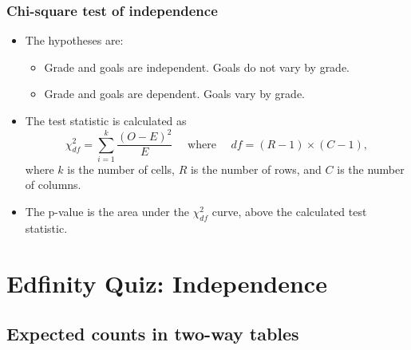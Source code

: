 \documentclass[slidestop,compress,mathserif]{beamer}
\begin{document}
\begin{frame}
\frametitle{Chi-square test of independence}

\begin{itemize}
\item The hypotheses are:
\begin{itemize}
\item[$H_0$:] Grade and goals are independent. Goals do not vary by grade.
\item[$H_A$:] Grade and goals are dependent. Goals vary by grade.
\end{itemize}

\pause

\item The test statistic is calculated as
\[ \chi^2_{df} = \sum_{i = 1}^{k} \frac{(O - E)^2}{E} \quad \text{ where } \quad df = (R - 1) \times (C - 1), \]
where $k$ is the number of cells, $R$ is the number of rows, and $C$ is the number of columns.


\pause

\item The p-value is the area under the $\chi^2_{df}$ curve, above the calculated test statistic.

\end{itemize}


\end{frame}

\section{Edfinity Quiz: Independence}


\subsection{Expected counts in two-way tables}

\end{document}

